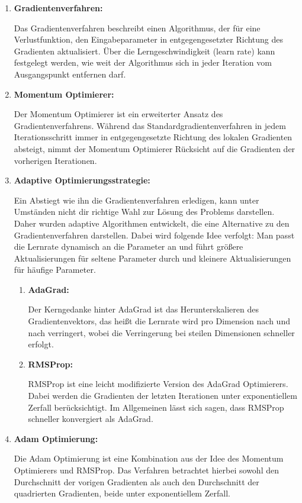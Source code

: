	\begin{enumerate}
		\item \textbf{Gradientenverfahren:}
		
			Das Gradientenverfahren beschreibt einen Algorithmus, der für eine Verlustfunktion, den Eingabeparameter in entgegengesetzter Richtung des Gradienten aktualisiert. Über die  Lerngeschwindigkeit (learn rate) kann festgelegt werden, wie weit der Algorithmus sich in jeder Iteration vom Ausgangspunkt entfernen darf. \cite{lucas_plagwitz}
		
		\item \textbf{Momentum Optimierer:}
		
			Der Momentum Optimierer ist ein erweiterter Ansatz des Gradientenverfahrens. Während das \glqq Standardgradientenverfahren\grqq{} in jedem Iterationsschritt immer in entgegengesetzte Richtung des lokalen Gradienten absteigt, nimmt der Momentum Optimierer Rücksicht auf die Gradienten der vorherigen Iterationen. \cite{lucas_plagwitz}
			
		\item \textbf{Adaptive Optimierungsstrategie:}
		
			Ein Abstiegt wie ihn die Gradientenverfahren erledigen, kann unter Umständen nicht dir richtige Wahl zur Lösung des Problems darstellen. Daher wurden adaptive Algorithmen entwickelt, die eine Alternative zu den Gradientenverfahren darstellen. Dabei wird folgende Idee verfolgt: Man passt die Lernrate dynamisch an die Parameter an und führt größere Aktualisierungen für seltene Parameter durch und kleinere Aktualisierungen für häufige Parameter. \cite{lucas_plagwitz}
			
			\begin{enumerate}
				\item \textbf{AdaGrad:}
				
					Der Kerngedanke hinter AdaGrad ist das Herunterskalieren des Gradientenvektors, das heißt die Lernrate wird pro Dimension nach und nach verringert, wobei die Verringerung bei steilen Dimensionen schneller erfolgt. \cite{lucas_plagwitz}
					
				\item \textbf{RMSProp:}
				
					RMSProp ist eine leicht modifizierte Version des AdaGrad Optimierers. Dabei werden die Gradienten der letzten Iterationen unter exponentiellem Zerfall  berücksichtigt. Im Allgemeinen lässt sich sagen, dass RMSProp schneller konvergiert als AdaGrad. \cite{lucas_plagwitz}
				
					
			\end{enumerate}
		
			
		\item \textbf{Adam Optimierung:}
		
			Die Adam Optimierung ist eine Kombination aus der Idee des Momentum Optimierers und RMSProp. Das Verfahren betrachtet hierbei sowohl den Durchschnitt der vorigen Gradienten als auch den Durchschnitt der quadrierten Gradienten, beide unter exponentiellem Zerfall. \cite{lucas_plagwitz}
			
	\end{enumerate}

